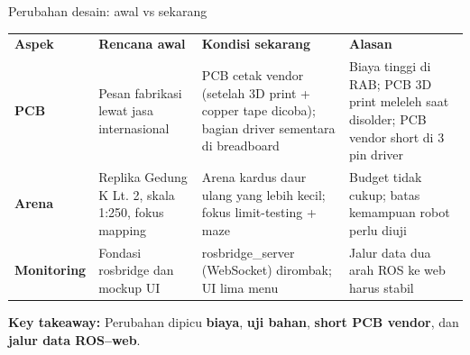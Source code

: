 \documentclass[aspectratio=169,10pt,t]{beamer}
\gdef\currnum{00}
\gdef\currlabel{}
\newcommand{\sect}[2]{\gdef\currnum{#1}\gdef\currlabel{#2}}
\newcommand{\takeawayc}[1]{%
    \par\vspace{6pt}\begin{dpanel}\small\textbf{\color{rblue}Key takeaway:} #1\end{dpanel}}
\newcommand{\hl}[1]{{\setlength{\fboxsep}{1.2pt}\colorbox{ryel}{\bfseries\color{rblue}#1}}}
\newcommand{\hd}[1]{\bfseries\color{white}#1}
\newcommand{\tablestyle}{\small\setlength{\tabcolsep}{6pt}\setlength{\extrarowheight}{3pt}\arrayrulecolor{rule}}
\begin{document}
    \sect{04}{Perubahan desain}
    \begin{frame}{Perubahan desain: awal vs sekarang}
        \tablestyle
        \renewcommand{\arraystretch}{1.0}
        \begin{tabularx}{\textwidth}{L{1.6cm} L{3.2cm} Y Y}
    \hd{Aspek}&\hd{Rencana awal}&\hd{Kondisi sekarang}&\hd{Alasan}\\
    \textbf{\color{rblue}PCB}&Pesan fabrikasi lewat jasa internasional&PCB cetak vendor (setelah 3D print + copper tape dicoba); bagian driver sementara di breadboard&Biaya tinggi di RAB; PCB 3D print meleleh saat disolder; PCB vendor short di 3 pin driver\\
    \textbf{\color{rblue}Arena}&Replika Gedung K Lt. 2, skala 1:250, fokus mapping&Arena kardus daur ulang yang lebih kecil; fokus limit-testing + maze&Budget tidak cukup; batas kemampuan robot perlu diuji\\
    \textbf{\color{rblue}Monitoring}&Fondasi rosbridge dan mockup UI&rosbridge\_server (WebSocket) dirombak; UI lima menu&Jalur data dua arah ROS ke web harus stabil\\
    \hline
        \end{tabularx}
        \takeawayc{Perubahan dipicu \hl{biaya}, \hl{uji bahan}, \hl{short PCB vendor}, dan \hl{jalur data ROS--web}.}
    \end{frame}
\end{document}
